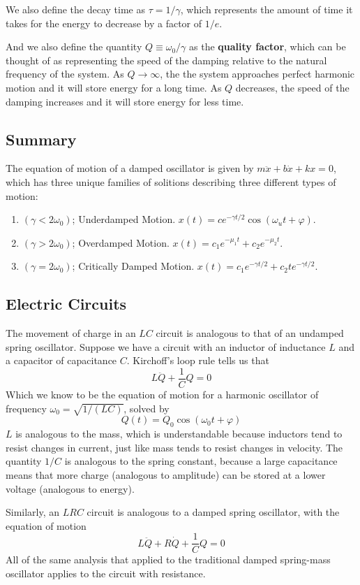 We also define the decay time as $\tau = 1/\gamma$, which represents the amount of time it takes for the energy to decrease by a factor of $1/e$. 

And we also define the quantity $Q \equiv \omega_0/\gamma$ as the \textbf{quality factor}, which can be thought of as representing the speed of the damping relative to the natural frequency of the system. As $Q\to\infty$, the the system approaches perfect harmonic motion and it will store energy for a long time. As $Q$ decreases, the speed of the damping increases and it will store energy for less time. 
\subsection*{Summary}
The equation of motion of a damped oscillator is given by $m\ddot x + b \dot x + kx = 0$, which has three unique families of solitions describing three different types of motion:
\begin{enumerate}
    \item $(\gamma < 2\omega_0)$; Underdamped Motion. $x(t) = ce^{-\gamma t/2}\cos(\omega_u t+\varphi)$. 
    \item $(\gamma > 2\omega_0)$; Overdamped Motion. $x(t) = c_1e^{-\mu_1 t} + c_2e^{-\mu_2 t}$.
    \item $(\gamma = 2\omega_0)$; Critically Damped Motion. $x(t) = c_1e^{-\gamma t/2} + c_2te^{-\gamma t/2}$.
\end{enumerate}
\subsection*{Electric Circuits}
The movement of charge in an $LC$ circuit is analogous to that of an undamped spring oscillator. Suppose we have a circuit with an inductor of inductance $L$ and a capacitor of capacitance $C$. Kirchoff's loop rule tells us that
\[ L\ddot Q + \frac{1}{C} Q = 0\]
Which we know to be the equation of motion for a harmonic oscillator of frequency $\omega_0 = \sqrt{1/(LC)}$, solved by
\[ Q(t) = Q_0\cos(\omega_0 t + \varphi)\]
$L$ is analogous to the mass, which is understandable because inductors tend to resist changes in current, just like mass tends to resist changes in velocity. The quantity $1/C$ is analogous to the spring constant, because a large capacitance means that more charge (analogous to amplitude) can be stored at a lower voltage (analogous to energy).

Similarly, an $LRC$ circuit is analogous to a damped spring oscillator, with the equation of motion
\[ L\ddot Q + R\dot Q + \frac{1}{C}Q = 0\]
All of the same analysis that applied to the traditional damped spring-mass oscillator applies to the circuit with resistance.

